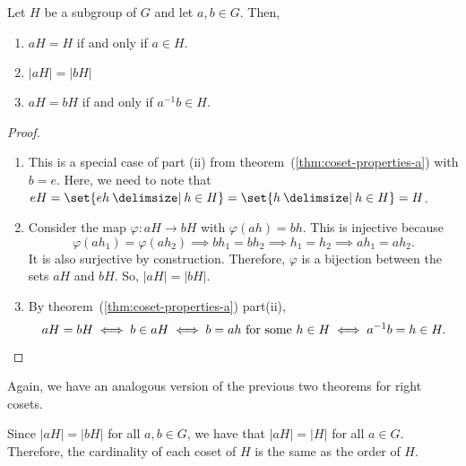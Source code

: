 \documentclass[11pt]{penrose}
\begin{document}
\begin{nthm}
    Let $H$ be a subgroup of $G$ and let $a, b \in G$. Then,
    \begin{enumerate}[label=(\roman*)]
        \item $aH = H$ if and only if $a \in H$.
        \item $|aH| = |bH|$
        \item $aH = bH$ if and only if $a^{-1} b \in H$.
    \end{enumerate}
\end{nthm}
\begin{proof}
    \begin{enumerate}[label=(\roman*)]
        \item This is a special case of part (ii) from theorem~(\ref{thm:coset-properties-a}) with $b = e$. Here, we need to note that $eH = \set{eh \st h \in H} = \set{h \st h \in H} = H$.

        \item Consider the map $\varphi : aH \to bH$ with $\varphi(ah) = bh$. This is injective because
        \begin{equation*}
            \varphi(ah_1) = \varphi(ah_2)
            \implies bh_1 = bh_2
            \implies h_1 = h_2
            \implies ah_1 = ah_2.
        \end{equation*}
        It is also surjective by construction. Therefore, $\varphi$ is a bijection between the sets $aH$ and $bH$. So, $|aH| = |bH|$.

        \item By theorem~(\ref{thm:coset-properties-a}) part(ii),
        \begin{equation*}
            aH = bH
            \iff b \in aH
            \iff b = ah \text{ for some } h \in H
            \iff a^{-1} b = h \in H.
            \qedhere
        \end{equation*}
    \end{enumerate}
\end{proof}

Again, we have an analogous version of the previous two theorems for right cosets.

\begin{remark}
    Since $|aH| = |bH|$ for all $a, b \in G$, we have that $|aH| = |H|$ for all $a \in G$. Therefore, the cardinality of each coset of $H$ is the same as the order of $H$.
\end{remark}
\end{document}
